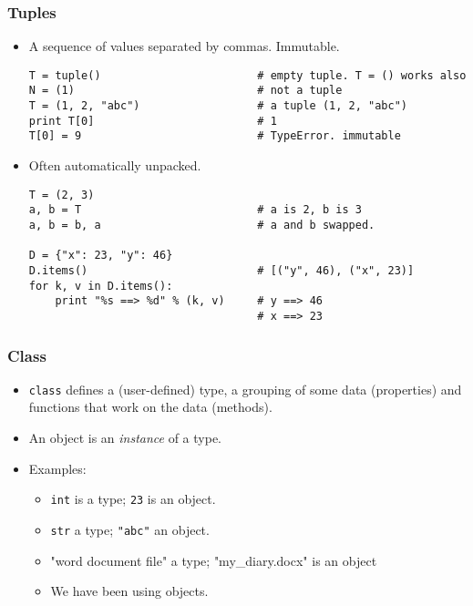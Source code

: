 \documentclass{beamer}
\begin{document}
\begin{frame}[fragile]
\frametitle{Tuples}
\begin{itemize}
\item A sequence of values separated by commas. Immutable.
\begin{lstlisting}
T = tuple()                        # empty tuple. T = () works also
N = (1)                            # not a tuple
T = (1, 2, "abc")                  # a tuple (1, 2, "abc")
print T[0]                         # 1
T[0] = 9                           # TypeError. immutable
\end{lstlisting}
\item Often automatically unpacked.
\begin{lstlisting}
T = (2, 3)
a, b = T                           # a is 2, b is 3
a, b = b, a                        # a and b swapped.

D = {"x": 23, "y": 46}
D.items()                          # [("y", 46), ("x", 23)]
for k, v in D.items():
    print "%s ==> %d" % (k, v)     # y ==> 46
                                   # x ==> 23
\end{lstlisting}
\end{itemize}
\end{frame}

\begin{frame}[fragile]
\frametitle{Class}
\begin{itemize}
\item \lstinline{class} defines a (user-defined) type,
      a grouping of some data (properties) and 
      functions that work on the data (methods).
\item An object is an \emph{instance} of a type.
\item Examples:
\begin{itemize}
  \item \lstinline{int} is a type; \lstinline{23} is an object.
  \item \lstinline{str} a type; \lstinline{"abc"} an object.
  \item "word document file" a type;
        "my\_diary.docx" is an object
\item We have been using objects.
\end{itemize}
\end{itemize}
\end{frame}
\end{document}
